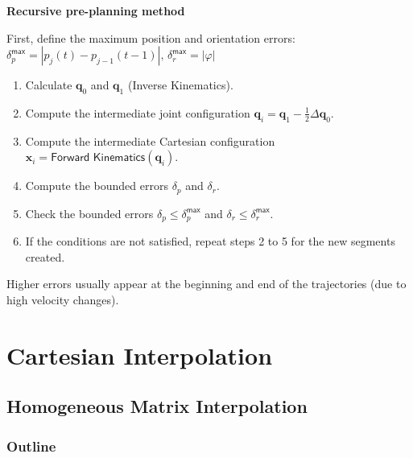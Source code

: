 \documentclass[10pt, aspectratio=169]{beamer}
\theoremstyle{remark}
\theoremstyle{definition}
\begin{document}
\begin{frame}[allowframebreaks]
    \framebreak

    \textbf{\textcolor{uma_blue_dark}{Recursive pre-planning method}}

    First, define the maximum position and orientation errors:
    $
    \delta_p^{\textsf{max}} = |p_j(t)-p_{j-1}(t-1)|, \, \delta_r^{\textsf{max}} = |\varphi|
    $
    \begin{enumerate}
        \item Calculate $\mathbf{q}_0$ and $\mathbf{q}_1$ (Inverse Kinematics).
        \item Compute the intermediate joint configuration $\mathbf{q}_i = \mathbf{q}_1-\frac{1}{2}\Delta\mathbf{q}_0$.
        \item Compute the intermediate Cartesian configuration $\mathbf{x}_i = \textsf{Forward Kinematics}(\mathbf{q}_i)$.
        \item Compute the bounded errors $\delta_p$ and $\delta_r$.
        \item Check the bounded errors $\delta_p \leq \delta_p^{\textsf{max}} $ and $\delta_r \leq \delta_r^{\textsf{max}}$.
        \item If the conditions are not satisfied, repeat steps 2 to 5 for the new segments created.
    \end{enumerate}

    Higher errors usually appear at the beginning and end of the trajectories (due to high velocity changes).
    


\end{frame}

\section{Cartesian Interpolation}
\subsection{Homogeneous Matrix Interpolation}
\begin{frame}
	\frametitle{Outline} %
\end{frame}
\end{document}
